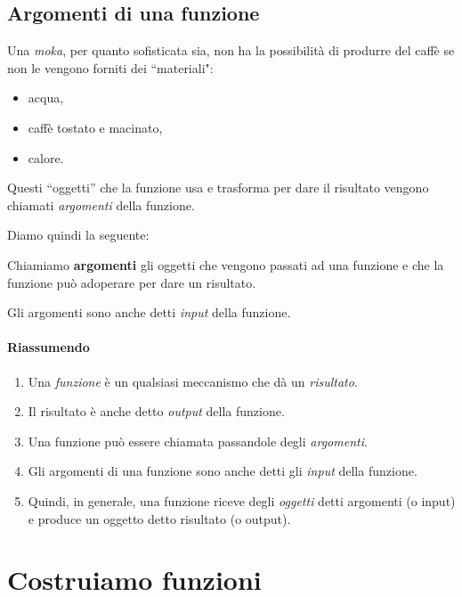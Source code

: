 \subsection{Argomenti di una funzione}
\label{subsec:funzioni2_argomenti}

Una \emph{moka}, per quanto sofisticata sia, non ha la possibilità di 
produrre del caffè se non le vengono forniti dei  ``materiali":
\begin{itemize} [noitemsep]
 \item acqua,
 \item caffè tostato e macinato,
 \item calore.
\end{itemize}

 Questi  ``oggetti'' che la funzione usa e trasforma per dare il risultato 
vengono chiamati \emph{argomenti} della funzione.
 
Diamo quindi la seguente:

\begin{definizione}
 Chiamiamo \textbf{argomenti} gli oggetti che vengono passati ad 
una funzione e che la funzione può adoperare per dare un risultato.
\end{definizione}

Gli argomenti sono anche detti \emph{input} della funzione.

\paragraph{Riassumendo}

\begin{enumerate} [noitemsep]
 \item Una \emph{funzione} è un qualsiasi meccanismo che dà un 
\emph{risultato}.
 \item Il risultato è anche detto \emph{output} della funzione.
 \item Una funzione può essere chiamata passandole degli \emph{argomenti}.
 \item Gli argomenti di una funzione sono anche detti gli \emph{input} 
della funzione.
 \item Quindi, in generale, una funzione riceve degli \emph{oggetti} detti 
argomenti (o input) e produce un oggetto detto risultato (o output).
\end{enumerate}

\section{Costruiamo funzioni}
\label{sec:funzioni2_costruiamo}

